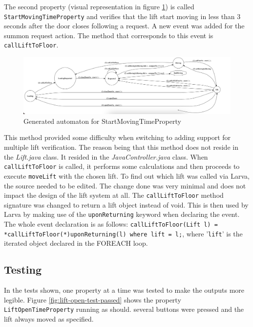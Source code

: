 \documentclass[a4paper, 12pt]{article}
\begin{document}
The second property (visual representation in figure \ref{fig:generated-automaton-StartMovingTimeProperty}) is called \texttt{StartMovingTimeProperty} and verifies that the lift start moving in less than 3 seconds after the door closes following a request. A new event was added for the summon request action. The method that corresponds to this event is \texttt{callLiftToFloor}. \\

\begin{figure}
   \centering
   \includegraphics[width=\textwidth,height=\textheight,keepaspectratio]{images/generated-automaton-StartMovingTimeProperty} %
   \caption{Generated automaton for StartMovingTimeProperty}
   \label{fig:generated-automaton-StartMovingTimeProperty}
\end{figure}

This method provided some difficulty when switching to adding support for multiple lift verification. The reason being that this method does not reside in the \textit{Lift.java} class. It resided in the \textit{JavaController.java} class. When \texttt{callLiftToFloor} is called, it performs some calculations and then proceeds to execute \texttt{moveLift} with the chosen lift. To find out which lift was called via Larva, the source needed to be edited. The change done was very minimal and does not impact the design of the lift system at all. The \texttt{callLiftToFloor} method signature was changed to return a lift object instead of void. This is then used by Larva by making use of the \texttt{uponReturning} keyword when declaring the event. The whole event declaration is as follows: \newline\texttt{callLiftToFloor(Lift l) = {*callLiftToFloor(*)uponReturning(l)} where {lift = l;}}, where '\texttt{lift}' is the iterated object declared in the FOREACH loop. 

\subsection{Testing}
In the tests shown, one property at a time was tested to make the outputs more legible. Figure \ref{fig:lift-open-test-passed} shows the property \texttt{LiftOpenTimeProperty} running as should. several buttons were pressed and the lift always moved as specified. \\
\end{document}
